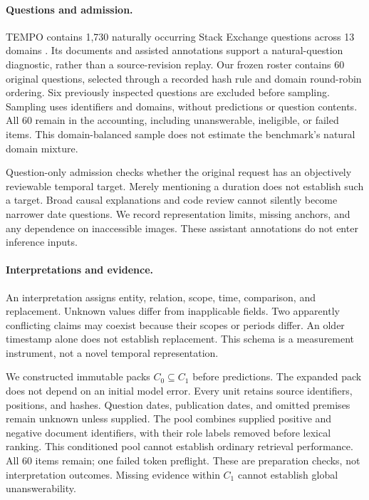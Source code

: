 \documentclass[11pt]{article}
\begin{document}
\paragraph{Questions and admission.}
TEMPO contains 1,730 naturally occurring Stack Exchange questions across 13 domains \citep{abdallah2026tempo}.
Its documents and assisted annotations support a natural-question diagnostic, rather than a source-revision replay.
Our frozen roster contains 60 original questions, selected through a recorded hash rule and domain round-robin ordering.
Six previously inspected questions are excluded before sampling.
Sampling uses identifiers and domains, without predictions or question contents.
All 60 remain in the accounting, including unanswerable, ineligible, or failed items.
This domain-balanced sample does not estimate the benchmark's natural domain mixture.

Question-only admission checks whether the original request has an objectively reviewable temporal target.
Merely mentioning a duration does not establish such a target.
Broad causal explanations and code review cannot silently become narrower date questions.
We record representation limits, missing anchors, and any dependence on inaccessible images.
These assistant annotations do not enter inference inputs.

\paragraph{Interpretations and evidence.}
An interpretation assigns entity, relation, scope, time, comparison, and replacement.
Unknown values differ from inapplicable fields.
Two apparently conflicting claims may coexist because their scopes or periods differ.
An older timestamp alone does not establish replacement.
This schema is a measurement instrument, not a novel temporal representation.

We constructed immutable packs $C_0\subseteq C_1$ before predictions.
The expanded pack does not depend on an initial model error.
Every unit retains source identifiers, positions, and hashes.
Question dates, publication dates, and omitted premises remain unknown unless supplied.
The pool combines supplied positive and negative document identifiers, with their role labels removed before lexical ranking.
This conditioned pool cannot establish ordinary retrieval performance.
All 60 items remain; one failed token preflight.
These are preparation checks, not interpretation outcomes.
Missing evidence within $C_1$ cannot establish global unanswerability.
\end{document}
